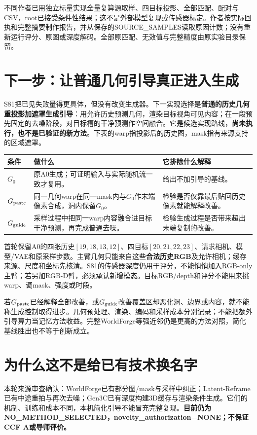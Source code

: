 \documentclass[UTF8,11pt,a4paper]{ctexart}
\begin{document}

不同作者已用独立标量实现全量复算源取样、四目标投影、全部匹配、配对与CSV，root已接受条件性结果；这不是外部模型复现或传感器标定。作者按实际回执和完整摘要制作报告，并从保存的SOURCE\_SAMPLES读取原因计数；没有重新运行评分、原图或深度解码。全部原匹配、无效值与完整精度由原实验目录保留。
\clearpage
\section{ 下一步：让普通几何引导真正进入生成}
S81把已见失败量得更具体，但没有改变生成器。下一实现选择是\textbf{普通的历史几何重投影加遮罩生成引导}：用允许历史预测几何，渲染目标视角可见内容；在一段预先固定的去噪阶段，对目标槽的干净预测作空间融合。它是候选实现路线，\textbf{尚未执行，也不是已验证的新方法}。下表的warp指投影后的历史图，mask指有来源支持的区域遮罩。

\begin{center}\small
\begin{tabular}{p{2.0cm}p{7.2cm}p{6.0cm}}\toprule
条件&做什么&它排除什么解释\\\midrule
$G_0$&原A0生成；可证明输入与实际随机流一致才复用。&给出不加引导的基线。\\
$G_{\rm paste}$&同一几何warp在同一mask内与$G_0$作末端像素合成，洞内保留$G_0$。&检验是否仅靠最后贴回历史像素就能解释改善。\\
$G_{\rm guide}$&采样过程中把同一warp内容融合进目标干净预测，再完成普通去噪。&检验生成过程是否带来超出末端复制的改善。\\\bottomrule
\end{tabular}\end{center}

首轮保留A0的四张历史$[19,18,13,12]$、四目标$[20,21,22,23]$、请求相机、模型/VAE和原采样步数。主臂几何只能来自这些\textbf{合法历史RGB}及允许相机；缓存来源、尺度和坐标先核清。S81的传感器深度仍用于评分，不能悄悄加入RGB-only主臂；若另加RGB-D臂，必须承认新增模态。目标RGB/depth和评分不能用来挑warp、调mask、强度或时段。

若$G_{\rm paste}$已经解释全部改善，或$G_{\rm guide}$改善覆盖区却恶化洞、边界或内容，就不能称生成控制取得进步。几何预处理、渲染、编码和采样成本分别记录；不能把额外引导算力当记忆方法收益。完整WorldForge等强近邻仍是更高的方法对照，简化基线胜出也不等于创新成立。

\section{ 为什么这不是给已有技术换名字}
本轮来源审查确认：WorldForge已有部分图/mask与采样中纠正；Latent-Reframe已有中途重拍与再次去噪；Gen3C已有深度构建3D缓存与渲染条件生成。它们的机制、训练和成本不同，本机简化引导不能冒充完整复现。\textbf{目前仍为NO\_METHOD\_SELECTED，novelty\_authorization=NONE；不保证CCF A或导师评价。}
\end{document}
